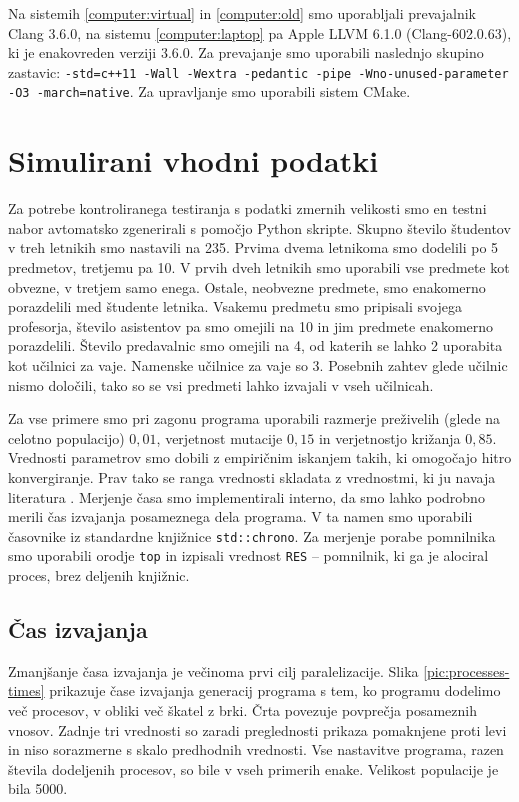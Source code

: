\documentclass[a4paper,12pt]{book}
\begin{document}
Na sistemih \ref{computer:virtual} in \ref{computer:old} smo uporabljali prevajalnik Clang 3.6.0, na sistemu \ref{computer:laptop} pa Apple LLVM 6.1.0 (Clang-602.0.63), ki je enakovreden verziji 3.6.0. Za prevajanje smo uporabili naslednjo skupino zastavic: \texttt{-std=c++11 -Wall -Wextra -pedantic -pipe -Wno-unused-parameter -O3 -march=native}. Za upravljanje smo uporabili sistem CMake. 

\section{Simulirani vhodni podatki}
Za potrebe kontroliranega testiranja s podatki zmernih velikosti smo en testni nabor avtomatsko zgenerirali s pomočjo Python skripte. Skupno število študentov v treh letnikih smo nastavili na 235. Prvima dvema letnikoma smo dodelili po 5 predmetov, tretjemu pa 10. V prvih dveh letnikih smo uporabili vse predmete kot obvezne, v tretjem samo enega. Ostale, neobvezne predmete, smo enakomerno porazdelili med študente letnika. Vsakemu predmetu smo pripisali svojega profesorja, število asistentov pa smo omejili na 10 in jim predmete enakomerno porazdelili. Število predavalnic smo omejili na 4, od katerih se lahko 2 uporabita kot učilnici za vaje. Namenske učilnice za vaje so 3. Posebnih zahtev glede učilnic nismo določili, tako so se vsi predmeti lahko izvajali v vseh učilnicah. 

Za vse primere smo pri zagonu programa uporabili razmerje preživelih (glede na celotno populacijo) $0{,}01$, verjetnost mutacije $0{,}15$ in verjetnostjo križanja $0{,}85$. Vrednosti parametrov smo dobili z empiričnim iskanjem takih, ki omogočajo hitro konvergiranje. Prav tako se ranga vrednosti skladata z vrednostmi, ki ju navaja literatura \cite{pongcharoen2002determining}. Merjenje časa smo implementirali interno, da smo lahko podrobno merili čas izvajanja posameznega dela programa. V ta namen smo uporabili časovnike iz standardne knjižnice \texttt{std::chrono}. Za merjenje porabe pomnilnika smo uporabili orodje \texttt{top} in izpisali vrednost \texttt{RES} -- pomnilnik, ki ga je alociral proces, brez deljenih knjižnic. 

\subsection{Čas izvajanja}
Zmanjšanje časa izvajanja je večinoma prvi cilj paralelizacije. Slika \ref{pic:processes-times} prikazuje čase izvajanja generacij programa s tem, ko programu dodelimo več procesov, v obliki več škatel z brki. Črta povezuje povprečja posameznih vnosov. Zadnje tri vrednosti so zaradi preglednosti prikaza pomaknjene proti levi in niso sorazmerne s skalo predhodnih vrednosti. Vse nastavitve programa, razen števila dodeljenih procesov, so bile v vseh primerih enake. Velikost populacije je bila 5000. 
\end{document}
